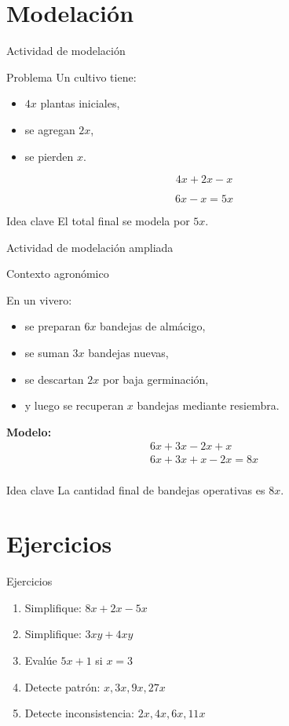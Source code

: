 \documentclass[handout,aspectratio=169,12pt]{beamer}
\newcommand{\IdeaClave}[1]{
	\begin{alertblock}{Idea clave}
		#1
	\end{alertblock}
}
\newcommand{\Agronomia}[1]{
	\begin{exampleblock}{Contexto agronómico}
		#1
	\end{exampleblock}
}
\begin{document}
	\section{Modelación}
	\begin{frame}{Actividad de modelación}
		\begin{block}{Problema}
			Un cultivo tiene:
			\begin{itemize}
				\item \(4x\) plantas iniciales,
				\pause
				\item se agregan \(2x\),
				\pause
				\item se pierden \(x\).
			\end{itemize}
		\end{block}
		
		\pause
		\[
		4x+2x-x
		\]
		
		\pause
		\[
		6x-x=5x
		\]
		
		\pause
		\IdeaClave{El total final se modela por \(5x\).}
	\end{frame}
	
	\begin{frame}{Actividad de modelación ampliada}
		\Agronomia{
			En un vivero:
			\begin{itemize}
				\item se preparan \(6x\) bandejas de almácigo,
				\pause
				\item se suman \(3x\) bandejas nuevas,
				\pause
				\item se descartan \(2x\) por baja germinación,
				\pause
				\item y luego se recuperan \(x\) bandejas mediante resiembra.
			\end{itemize}
		}
		
		\pause
		\textbf{Modelo:}
		\[
		\begin{array}{c}
		6x+3x-2x+x \\
		6x+3x+x-2x = 8x \\
		\end{array}
		\]
		\pause
		\IdeaClave{La cantidad final de bandejas operativas es \(8x\).}
	\end{frame}
	
	\section{Ejercicios}
	\begin{frame}{Ejercicios}
		\begin{enumerate}[<+->]
			\item Simplifique: \(8x+2x-5x\)
			\item Simplifique: \(3xy+4xy\)
			\item Evalúe \(5x+1\) si \(x=3\)
			\item Detecte patrón: \(x,3x,9x,27x\)
			\item Detecte inconsistencia: \(2x,4x,6x,11x\)
		\end{enumerate}
	\end{frame}
	
\end{document}
